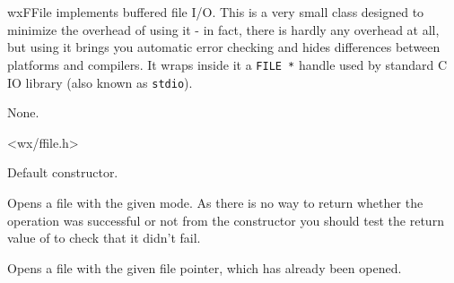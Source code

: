 
\section{}\label{wxffile}

wxFFile implements buffered file I/O. This is a very small class designed to
minimize the overhead of using it - in fact, there is hardly any overhead at
all, but using it brings you automatic error checking and hides differences
between platforms and compilers. It wraps inside it a {\tt FILE *} handle used
by standard C IO library (also known as {\tt stdio}).


None.


<wx/ffile.h>

\twocolwidtha{7cm}
\begin{twocollist}\itemsep=0pt%
\end{twocollist}


\label{wxffileconstr}


Default constructor.


Opens a file with the given mode. As there is no way to return whether the
operation was successful or not from the constructor you should test the
return value of  to check that it didn't
fail.


Opens a file with the given file pointer, which has already been opened.

